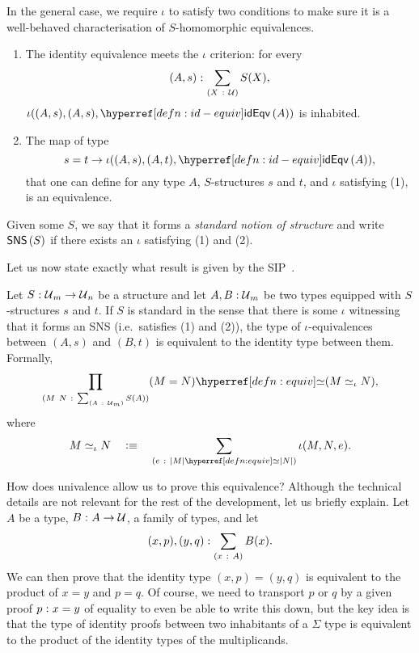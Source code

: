 In the general case, we require $\iota$ to satisfy two conditions to make sure it is a
well-behaved characterisation of $S$-homomorphic equivalences.
\begin{enumerate}
  \item The identity equivalence meets the $\iota$ criterion: for every $$(A,
    s)\hspace{0.1mm}:\hspace{0.1mm}\sum_{(X~:~\mathcal{U}{})} S(X),$$ $\iota((A, s), (A, s), \idequiv{A})$ is inhabited.
  \item The map of type
    \begin{equation*}
      s = t \rightarrow \iota((A, s), (A, t), \idequiv{A}),
    \end{equation*}
    that one can define for any type $A$, $S$-structures $s$ and $t$, and $\iota$ satisfying
    (1), is an equivalence.
\end{enumerate}

Given some $S$, we say that it forms a \emph{standard notion of structure} and write
$\mathsf{SNS}\left(S\right)$ if there exists an $\iota$ satisfying (1) and (2).

Let us now state exactly what result is given by the
SIP~\cite{escardo-uf-intro, agda-cubical}.
\begin{defn}
  Let $S\hspace{0.1mm}:\hspace{0.1mm}\mathcal{U}{}_m \rightarrow \mathcal{U}{}_n$ be a structure and let $A, B:\mathcal{U}{}_m$
  be two types equipped with $S$-structures $s$ and $t$. If $S$ is standard in the sense
  that there is some $\iota$ witnessing that it forms an SNS (i.e.~satisfies (1) and (2)), the
  type of $\iota$-equivalences between $(A, s)$ and $(B, t)$ is equivalent to the identity
  type between them. Formally,
  \begin{equation*}
    \pity{M~N}{\sigmaty{A}{\univ{}_m}{S(A)}}{\typequiv{(M = N)}{(M \simeq_{\iota} N)}},
  \end{equation*}
  where
  \begin{equation*}
    M \simeq_{\iota} N \quad\is\quad \sigmaty{e}{\typequiv{\abs{M}}{\abs{N}}}{\iota(M, N, e)}.
  \end{equation*}
\end{defn}

How does univalence allow us to prove this equivalence? Although the technical details are
not relevant for the rest of the development, let us briefly explain. Let $A$ be a type,
$B\hspace{0.1mm}:\hspace{0.1mm}A \rightarrow \mathcal{U}{}$, a family of types, and let
\begin{equation*}
  (x, p), (y, q):\sum_{(x~:~A)} B(x).
\end{equation*}
We can then prove that the identity type $(x , p) = (y , q)$ is equivalent to the product
of $x = y$ and $p = q$. Of course, we need to transport $p$ or $q$ by a given proof
$p\hspace{0.1mm}:\hspace{0.1mm}x = y$ of equality to even be able to write this down, but the key idea is
that the type of identity proofs between two inhabitants of a $\Sigma$ type is equivalent to
the product of the identity types of the multiplicands.

